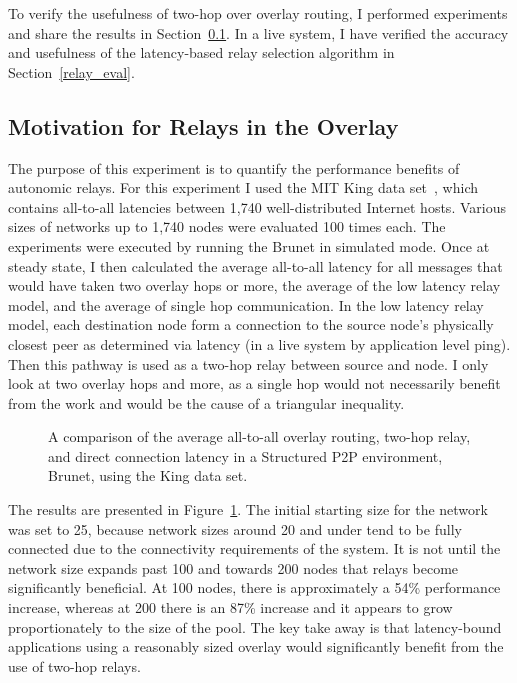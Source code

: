 To verify the usefulness of two-hop over overlay routing, I performed
experiments and share the results in Section~\ref{relay_motivation}.  In a live
system, I have verified the accuracy and usefulness of the latency-based relay
selection algorithm in Section~\ref{relay_eval}.

\subsection{Motivation for Relays in the Overlay}
\label{relay_motivation}

The purpose of this experiment is to quantify the performance benefits of
autonomic relays.  For this experiment I used the MIT King data
set~\cite{king_data}, which contains all-to-all latencies between 1,740
well-distributed Internet hosts.  Various sizes of networks up to 1,740 nodes
were evaluated 100 times each.  The experiments were executed by running the
Brunet in simulated mode.  Once at steady state, I then calculated the average
all-to-all latency for all messages that would have taken two overlay hops or
more, the average of the low latency relay model, and the average of single hop
communication.  In the low latency relay model, each destination node form a
connection to the source node's physically closest peer as determined via
latency (in a live system by application level ping).  Then this pathway is
used as a two-hop relay between source and node.  I only look at two overlay
hops and more, as a single hop would not necessarily benefit from the work and
would be the cause of a triangular inequality.  

\begin{figure}
\centering
{}
\caption[The evaluation of relays]{A comparison of the average all-to-all overlay
routing, two-hop relay, and direct connection latency in a Structured P2P
environment, Brunet, using the King data set.}
\label{fig:simulated_relays}
\end{figure}

The results are presented in Figure~\ref{fig:simulated_relays}.  The initial
starting size for the network was set to 25, because network sizes around 20
and under tend to be fully connected due to the connectivity requirements of
the system.  It is not until the network size expands past 100 and towards 200
nodes that relays become significantly beneficial.  At 100 nodes, there is
approximately a 54\% performance increase, whereas at 200 there is an 87\%
increase and it appears to grow proportionately to the size of the pool.  The
key take away is that latency-bound applications using a reasonably sized
overlay would significantly benefit from the use of two-hop relays.

